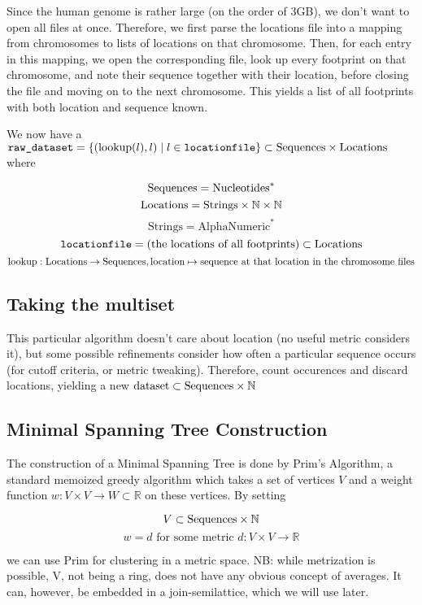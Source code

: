\documentclass[fleqn]{book}
\begin{document}
Since the human genome is rather large (on the order of 3GB), we don't
want to open all files at once. Therefore, we first parse the locations
file into a mapping from chromosomes to lists of locations on that
chromosome. Then, for each entry in this mapping, we open the
corresponding file, look up every footprint on that chromosome, and note
their sequence together with their location, before closing the file and
moving on to the next chromosome. This yields a list of all footprints
with both location and sequence known.

We now have a
\(\texttt{raw\_dataset} = \{(\operatorname{lookup}(l), l) \mid l \in \texttt{locationfile} \} \subset \text{Sequences} \times \text{Locations}\)
where

\[\text{Sequences} = \text{Nucleotides}^*\]
\[\text{Locations} = \text{Strings} \times \mathbb{N} \times \mathbb{N}\]
\[\text{Strings} = \text{AlphaNumeric}^*\]
\[\texttt{locationfile} = \text{(the locations of all footprints)} \subset \text{Locations}\]
\[\operatorname{lookup} : \text{Locations} \rightarrow \text{Sequences}, \text{location} \mapsto \text{sequence at that location in the chromosome files}\]

\subsection{Taking the multiset}\label{taking-the-multiset}

This particular algorithm doesn't care about location (no useful metric
considers it), but some possible refinements consider how often a
particular sequence occurs (for cutoff criteria, or metric tweaking).
Therefore, count occurences and discard locations, yielding a new
\(\text{dataset} \subset \text{Sequences} \times \mathbb{N}\)

\subsection{Minimal Spanning Tree
Construction}\label{minimal-spanning-tree-construction}

The construction of a Minimal Spanning Tree is done by Prim's Algorithm,
a standard memoized greedy algorithm which takes a set of vertices \(V\)
and a weight function \(w: V \times V \rightarrow W \subset \mathbb{R}\)
on these vertices. By setting

\[V \subset \text{Sequences} \times \mathbb{N}\]
\[w = d\text{ for some metric }d : V \times V \rightarrow ℝ\]

we can use Prim for clustering in a metric space. NB: while metrization
is possible, V, not being a ring, does not have any obvious concept of
averages. It can, however, be embedded in a join-semilattice, which we
will use later.
\end{document}
